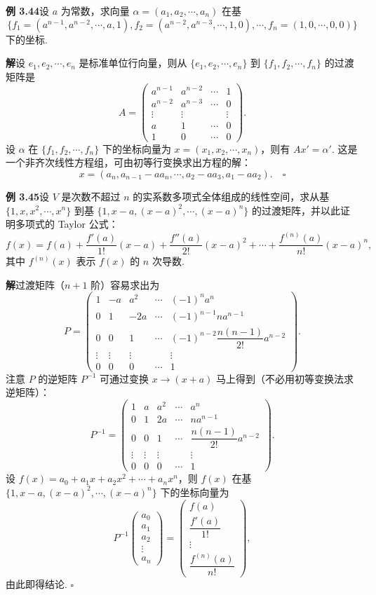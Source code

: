 \documentclass[UTF8,12pt,a4paper,fontset=fandol]{ctexart}
\begin{document}
\noindent\textbf{例 3.44}\quad 设 $a$ 为常数，求向量 $\alpha=(a_1,a_2,\cdots,a_n)$ 在基
\[
\{f_1=(a^{n-1},a^{n-2},\cdots,a,1),f_2=(a^{n-2},a^{n-3},\cdots,1,0),\cdots,f_n=(1,0,\cdots,0,0)\}
\]
下的坐标.

\noindent\textbf{解}\quad 设 $e_1,e_2,\cdots,e_n$ 是标准单位行向量，则从 $\{e_1,e_2,\cdots,e_n\}$ 到 $\{f_1,f_2,\cdots,f_n\}$ 的过渡矩阵是
\[
A=
\begin{pmatrix}
a^{n-1} & a^{n-2} & \cdots & 1\\
a^{n-2} & a^{n-3} & \cdots & 0\\
\vdots & \vdots &        & \vdots\\
a & 1 & \cdots & 0\\
1 & 0 & \cdots & 0
\end{pmatrix}.
\]
设 $\alpha$ 在 $\{f_1,f_2,\cdots,f_n\}$ 下的坐标向量为 $x=(x_1,x_2,\cdots,x_n)$，则有 $Ax'=\alpha'$. 这是一个非齐次线性方程组，可由初等行变换求出方程的解：
\[
x=(a_n,a_{n-1}-aa_n,\cdots,a_2-aa_3,a_1-aa_2). \quad \square
\]

\noindent\textbf{例 3.45}\quad 设 $V$ 是次数不超过 $n$ 的实系数多项式全体组成的线性空间，求从基 $\{1,x,x^2,\cdots,x^n\}$ 到基 $\{1,x-a,(x-a)^2,\cdots,(x-a)^n\}$ 的过渡矩阵，并以此证明多项式的 Taylor 公式：
\[
f(x)=f(a)+\frac{f'(a)}{1!}(x-a)+\frac{f''(a)}{2!}(x-a)^2+\cdots+\frac{f^{(n)}(a)}{n!}(x-a)^n,
\]
其中 $f^{(n)}(x)$ 表示 $f(x)$ 的 $n$ 次导数.

\noindent\textbf{解}\quad 过渡矩阵（$n+1$ 阶）容易求出为
\[
P=
\begin{pmatrix}
1 & -a & a^2 & \cdots & (-1)^n a^n\\
0 & 1 & -2a & \cdots & (-1)^{n-1}na^{n-1}\\
0 & 0 & 1 & \cdots & (-1)^{n-2}\dfrac{n(n-1)}{2!}a^{n-2}\\
\vdots & \vdots & \vdots &        & \vdots\\
0 & 0 & 0 & \cdots & 1
\end{pmatrix}.
\]
注意 $P$ 的逆矩阵 $P^{-1}$ 可通过变换 $x\to(x+a)$ 马上得到（不必用初等变换法求逆矩阵）：
\[
P^{-1}=
\begin{pmatrix}
1 & a & a^2 & \cdots & a^n\\
0 & 1 & 2a & \cdots & na^{n-1}\\
0 & 0 & 1 & \cdots & \dfrac{n(n-1)}{2!}a^{n-2}\\
\vdots & \vdots & \vdots &        & \vdots\\
0 & 0 & 0 & \cdots & 1
\end{pmatrix}.
\]
设 $f(x)=a_0+a_1x+a_2x^2+\cdots+a_nx^n$，则 $f(x)$ 在基 $\{1,x-a,(x-a)^2,\cdots,(x-a)^n\}$ 下的坐标向量为
\[
P^{-1}\begin{pmatrix}a_0\\a_1\\a_2\\\vdots\\a_n\end{pmatrix}
=
\begin{pmatrix}
f(a)\\
\dfrac{f'(a)}{1!}\\
\vdots\\
\dfrac{f^{(n)}(a)}{n!}
\end{pmatrix},
\]
由此即得结论. $\square$
\end{document}
